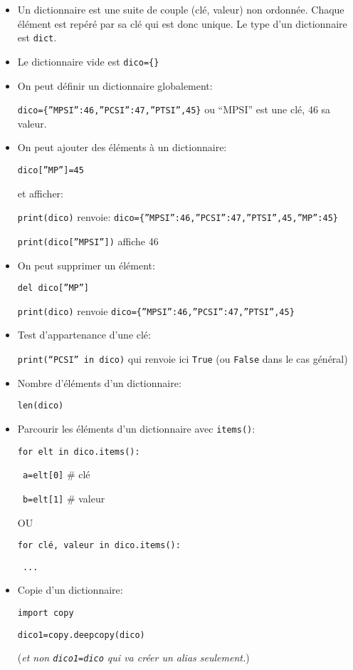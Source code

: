 \begin{itemize}\item  Un dictionnaire est une suite de couple (clé, valeur) non ordonnée. Chaque élément est repéré par sa clé qui est donc unique. Le type d'un dictionnaire est \texttt{dict}.
	
	\item  Le dictionnaire vide est \texttt{dico=\{\}}
	
	\item  On peut définir un dictionnaire globalement:
	
	\texttt{dico=\{”MPSI”:46,”PCSI”:47,”PTSI”,45\}}	ou “MPSI” est une clé, 46 sa valeur.
	
	\item  On peut ajouter des éléments à un dictionnaire:
	
	\texttt{dico[”MP”]=45}
	
	et afficher:
	
	\texttt{print(dico)} renvoie: \texttt{dico=\{”MPSI”:46,”PCSI”:47,”PTSI”,45,”MP”:45\}}

\texttt{print(dico[”MPSI”])} affiche 46

\item On peut supprimer un élément:

\texttt{del dico[”MP”]}	

\texttt{print(dico)} renvoie \texttt{dico=\{”MPSI”:46,”PCSI”:47,”PTSI”,45\}}

\item Test d'appartenance d'une clé:

\texttt{print(“PCSI” in dico)} qui renvoie ici \texttt{True} (ou \texttt{False} dans le cas général)

\item Nombre d'éléments d'un dictionnaire:

\texttt{len(dico)}

\item  Parcourir les éléments d'un dictionnaire avec \texttt{items()}:

\texttt{for elt in dico.items():}

\texttt{\ \qquad  a=elt[0]}  \# clé

\texttt{\ \qquad  b=elt[1]}   \# valeur

OU

\texttt{for clé, valeur in dico.items():}	

\texttt{\ \qquad  ...}

\item  Copie d'un dictionnaire:

\texttt{import copy}

\texttt{dico1=copy.deepcopy(dico)}	

(\textit{et non \texttt{dico1=dico} qui va créer un alias seulement.})

\end{itemize}

